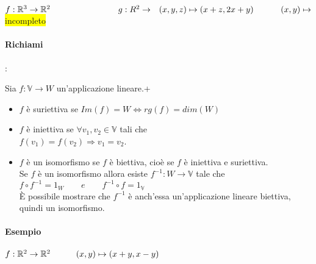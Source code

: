 \documentclass{article}
\newcommand{\hl}[1]{\colorbox{yellow}{#1}}
\newcommand{\R}{\mathbb{R}}
\newcommand{\V}{\mathbb{V}}
\begin{document}
$f:\R^3\rightarrow\R^2\hspace{8em} g:R^2\rightarrow\\\hspace*{0.7em}(x,y,z)\mapsto(x+z,2x+y)\hspace*{3.2em}(x,y)\mapsto$ \hl{incompleto}

\paragraph{Richiami}:

Sia $f:\V\rightarrow W$ un'applicazione lineare.+
\begin{itemize}
	\item $f$ è suriettiva se $Im(f)=W\Leftrightarrow rg(f)=dim(W)$
	\item $f$ è iniettiva se $\forall v_1,v_2\in\V$ tali che\\
	      $f(v_1)=f(v_2)\Rightarrow v_1=v_2$.
	\item $f$ è un isomorfismo se $f$ è biettiva, cioè se $f$ è iniettiva e suriettiva.\\
	      Se $f$ è un isomorfismo allora esiste $f^{-1}:W\rightarrow\V$ tale che\\
	      $f\circ f^{-1}=1_W\qquad e\qquad f^{-1}\circ f=1_\V$\\
	      È possibile mostrare che $f^{-1}$ è anch'essa un'applicazione lineare biettiva, quindi un isomorfismo.
\end{itemize}

\paragraph*{Esempio}

$f:\R^2\rightarrow\R^2\\\hspace*{3em}(x,y)\mapsto(x+y,x-y)$
\end{document}
